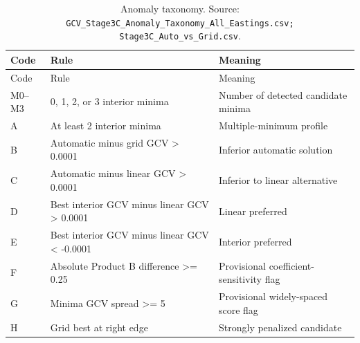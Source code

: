 \begin{longtable}{@{}p{2.2cm}p{6.2cm}p{6.4cm}@{}}
\caption{Anomaly taxonomy. Source: \texttt{GCV\_Stage3C\_Anomaly\_Taxonomy\_All\_Eastings.csv; Stage3C\_Auto\_vs\_Grid.csv}.}\label{tab:anomaly-taxonomy}\\
\toprule
Code & Rule & Meaning\\
\midrule
\endfirsthead
\toprule
Code & Rule & Meaning\\
\midrule
\endhead
M0--M3 & 0, 1, 2, or 3 interior minima & Number of detected candidate minima\\
A & At least 2 interior minima & Multiple-minimum profile\\
B & Automatic minus grid GCV > 0.0001 & Inferior automatic solution\\
C & Automatic minus linear GCV > 0.0001 & Inferior to linear alternative\\
D & Best interior GCV minus linear GCV > 0.0001 & Linear preferred\\
E & Best interior GCV minus linear GCV < -0.0001 & Interior preferred\\
F & Absolute Product B difference >= 0.25 & Provisional coefficient-sensitivity flag\\
G & Minima GCV spread >= 5 & Provisional widely-spaced score flag\\
H & Grid best at right edge & Strongly penalized candidate\\
\bottomrule
\end{longtable}
